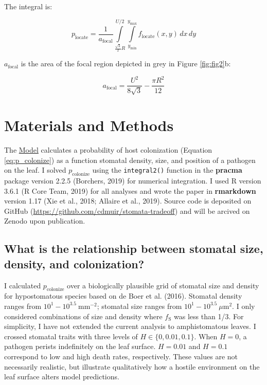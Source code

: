 \documentclass[utf8]{frontiersSCNS}
\newcommand{\fs}{$f_\text{S}$}
\begin{document}
The integral is:

\begin{equation}
  p_\text{locate} = \frac{1}{a_\text{focal}}\int\limits_{\frac{\sqrt{3}}{2} R} ^ {U / 2} \int\limits_{y_\mathrm{min}} ^ {y_\mathrm{max}} f_\text{locate}(x, y) \,dx \,dy
\end{equation}

\(a_\text{focal}\) is the area of the focal region depicted in grey in
Figure \ref{fig:fig2}b:

\[ a_\text{focal} = \frac{U ^ 2}{8 \sqrt{3}} - \frac{\pi R ^ 2}{12} \]

\hypertarget{materials-and-methods}{%
\section*{Materials and Methods}\label{materials-and-methods}}

The \protect\hyperlink{model}{Model} calculates a probability of host
colonization (Equation \ref{eq:p_colonize}) as a function stomatal
density, size, and position of a pathogen on the leaf. I solved
\(p_\text{colonize}\) using the \texttt{integral2()} function in the
\textbf{pracma} package version 2.2.5 (Borchers, 2019) for numerical
integration. I used R version 3.6.1 (R Core Team, 2019) for all analyses
and wrote the paper in \textbf{rmarkdown} version 1.17 (Xie et al.,
2018; Allaire et al., 2019). Source code is deposited on GitHub
(\url{https://github.com/cdmuir/stomata-tradeoff}) and will be arcived
on Zenodo upon publication.

\hypertarget{what-is-the-relationship-between-stomatal-size-density-and-colonization}{%
\subsection*{What is the relationship between stomatal size, density,
and
colonization?}\label{what-is-the-relationship-between-stomatal-size-density-and-colonization}}

I calculated \(p_\text{colonize}\) over a biologically plausible grid of
stomatal size and density for hypostomatous species based on de Boer et
al. (2016). Stomatal density ranges from
\(10^1 - 10^{3.5}~\text{mm}^{-2}\); stomatal size ranges from
\(10^1 - 10^{3.5}~\mu\text{m}^2\). I only considered combinations of
size and density where \fs{} was less than 1/3. For simplicity, I have
not extended the current analysis to amphistomatous leaves. I crossed
stomatal traits with three levels of \(H \in \{0, 0.01, 0.1\}\). When
\(H = 0\), a pathogen perists indefinitely on the leaf surface.
\(H = 0.01\) and \(H = 0.1\) correspond to low and high death rates,
respectively. These values are not necessarily realistic, but illustrate
qualitatively how a hostile environment on the leaf surface alters model
predictions.
\end{document}
